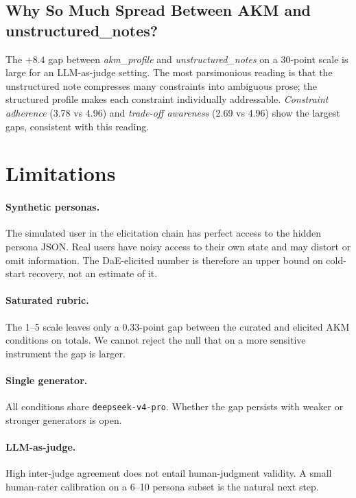 \documentclass[11pt]{article}
\begin{document}
\subsection{Why So Much Spread Between AKM and unstructured\_notes?}

The $+8.4$ gap between \textit{akm\_profile} and \textit{unstructured\_notes} on a 30-point scale is large for an LLM-as-judge setting. The most parsimonious reading is that the unstructured note compresses many constraints into ambiguous prose; the structured profile makes each constraint individually addressable. \emph{Constraint adherence} (3.78 vs 4.96) and \emph{trade-off awareness} (2.69 vs 4.96) show the largest gaps, consistent with this reading.

\section{Limitations}
\label{sec:limits}

\paragraph{Synthetic personas.} The simulated user in the elicitation chain has perfect access to the hidden persona JSON. Real users have noisy access to their own state and may distort or omit information. The DaE-elicited number is therefore an upper bound on cold-start recovery, not an estimate of it.

\paragraph{Saturated rubric.} The 1--5 scale leaves only a $0.33$-point gap between the curated and elicited AKM conditions on totals. We cannot reject the null that on a more sensitive instrument the gap is larger.

\paragraph{Single generator.} All conditions share \texttt{deepseek-v4-pro}. Whether the gap persists with weaker or stronger generators is open.

\paragraph{LLM-as-judge.} High inter-judge agreement does not entail human-judgment validity. A small human-rater calibration on a 6--10 persona subset is the natural next step.
\end{document}
